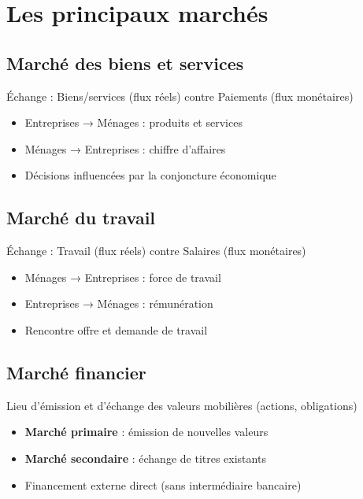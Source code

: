 \documentclass[12pt,a4paper]{article}
\begin{document}
\section{Les principaux marchés}

\subsection{Marché des biens et services}
\begin{tcolorbox}[title=\textbf{POINT CLÉ}]
Échange : Biens/services (flux réels) contre Paiements (flux monétaires)
\end{tcolorbox}
\begin{itemize}
    \item Entreprises → Ménages : produits et services
    \item Ménages → Entreprises : chiffre d'affaires
    \item Décisions influencées par la conjoncture économique
\end{itemize}

\subsection{Marché du travail}
\begin{tcolorbox}[title=\textbf{POINT CLÉ}]
Échange : Travail (flux réels) contre Salaires (flux monétaires)
\end{tcolorbox}
\begin{itemize}
    \item Ménages → Entreprises : force de travail
    \item Entreprises → Ménages : rémunération
    \item Rencontre offre et demande de travail
\end{itemize}

\subsection{Marché financier}
\begin{tcolorbox}[title=\textbf{POINT CLÉ}]
Lieu d'émission et d'échange des valeurs mobilières (actions, obligations)
\end{tcolorbox}
\begin{itemize}
    \item \textbf{Marché primaire} : émission de nouvelles valeurs
    \item \textbf{Marché secondaire} : échange de titres existants
    \item Financement externe direct (sans intermédiaire bancaire)
\end{itemize}
\end{document}
